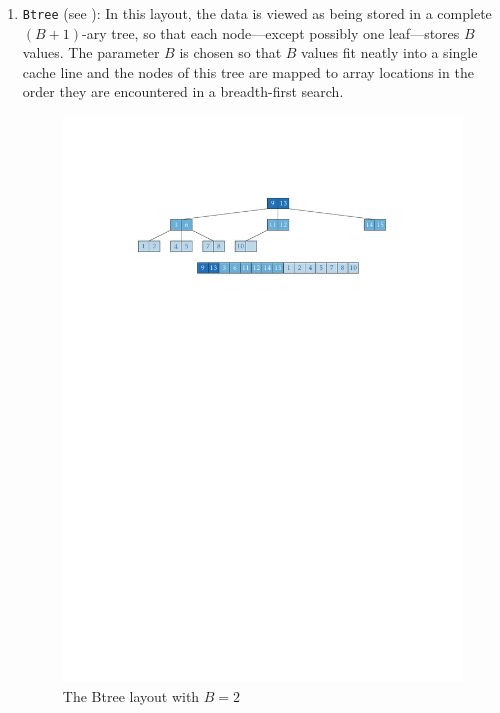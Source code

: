 \documentclass{patmorin}
\begin{document}
\begin{enumerate}

  \item \texttt{Btree} (see ): In this layout, the data is
  viewed as being stored in a complete $(B+1)$-ary tree, so that each
  node---except possibly one leaf---stores $B$ values.  The parameter
  $B$ is chosen so that $B$ values fit neatly into a single cache line
  and the nodes of this tree are mapped to array locations in the order
  they are encountered in a breadth-first search.

  \begin{figure}
    \begin{center}\includegraphics{btree}\end{center}
    \caption{The Btree layout with $B=2$}
  \end{figure}


\end{enumerate}
\end{document}

